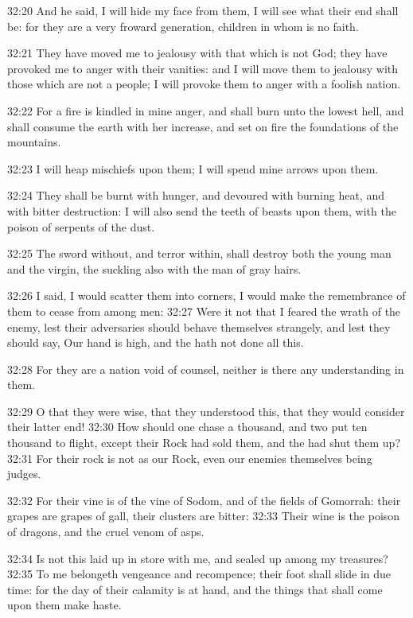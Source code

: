 32:20 And he said, I will hide my face from them, I will see what their end shall be: for they are a very froward generation, children in whom is no faith.

32:21 They have moved me to jealousy with that which is not God; they have provoked me to anger with their vanities: and I will move them to jealousy with those which are not a people; I will provoke them to anger with a foolish nation.

32:22 For a fire is kindled in mine anger, and shall burn unto the lowest hell, and shall consume the earth with her increase, and set on fire the foundations of the mountains.

32:23 I will heap mischiefs upon them; I will spend mine arrows upon them.

32:24 They shall be burnt with hunger, and devoured with burning heat, and with bitter destruction: I will also send the teeth of beasts upon them, with the poison of serpents of the dust.

32:25 The sword without, and terror within, shall destroy both the young man and the virgin, the suckling also with the man of gray hairs.

32:26 I said, I would scatter them into corners, I would make the remembrance of them to cease from among men: 32:27 Were it not that I feared the wrath of the enemy, lest their adversaries should behave themselves strangely, and lest they should say, Our hand is high, and the \LORD hath not done all this.

32:28 For they are a nation void of counsel, neither is there any understanding in them.

32:29 O that they were wise, that they understood this, that they would consider their latter end!  32:30 How should one chase a thousand, and two put ten thousand to flight, except their Rock had sold them, and the \LORD had shut them up?  32:31 For their rock is not as our Rock, even our enemies themselves being judges.

32:32 For their vine is of the vine of Sodom, and of the fields of Gomorrah: their grapes are grapes of gall, their clusters are bitter: 32:33 Their wine is the poison of dragons, and the cruel venom of asps.

32:34 Is not this laid up in store with me, and sealed up among my treasures?  32:35 To me belongeth vengeance and recompence; their foot shall slide in due time: for the day of their calamity is at hand, and the things that shall come upon them make haste.

